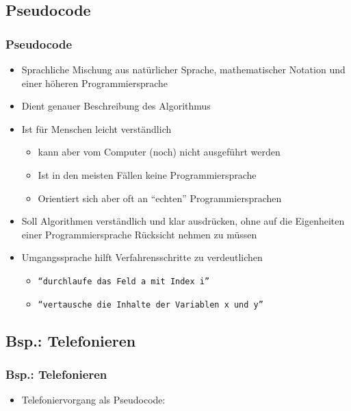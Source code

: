   \subsection{Pseudocode}
  \begin{frame}
      \frametitle{Pseudocode}
      \begin{itemize}
          \item Sprachliche Mischung aus natürlicher Sprache, mathematischer Notation und einer höheren Programmiersprache
          \item Dient genauer Beschreibung des Algorithmus
          \item Ist für Menschen leicht verständlich
          \begin{itemize}
              \item kann aber vom Computer (noch) nicht ausgeführt werden
              \item Ist in den meisten Fällen keine Programmiersprache
              \item Orientiert sich aber oft an ``echten'' Programmiersprachen
          \end{itemize}
          \item Soll Algorithmen verständlich und klar ausdrücken, ohne auf die Eigenheiten einer Programmiersprache Rücksicht nehmen zu müssen
          \item Umgangssprache hilft Verfahrensschritte zu verdeutlichen
          \begin{itemize}
            \item \texttt{``durchlaufe das Feld a mit Index i''}
            \item \texttt{``vertausche die Inhalte der Variablen x und y''}
          \end{itemize}
      \end{itemize}
  \end{frame}

  \subsection{Bsp.: Telefonieren}
  \begin{frame}
      \frametitle{Bsp.: Telefonieren}
      \begin{itemize}
          \item Telefoniervorgang als Pseudocode:
          
      \end{itemize}
    \end{frame}

